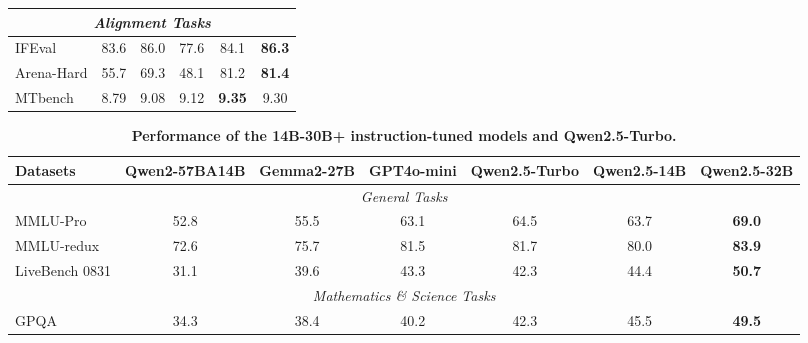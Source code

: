 \documentclass{article}
\begin{document}
\begin{table}[tbp]
\begin{tabular}{@{}lccccc@{}}
\midrule
\multicolumn{6}{c}{\textit{Alignment Tasks}} \\
\midrule

IFEval  & 83.6 & 86.0 & 77.6 & 84.1 & \textbf{86.3}\\

Arena-Hard  & 55.7 & 69.3 & 48.1 & 81.2 & \textbf{81.4}\\

MTbench  & 8.79 & 9.08 & 9.12 & \textbf{9.35} & 9.30\\

\bottomrule

\end{tabular}

\end{table}

\begin{table}[tbp]

\centering

\caption{\textbf{Performance of the 14B-30B+ instruction-tuned models and Qwen2.5-Turbo.}}

\label{tab:14b-instruct}
\small
\setlength{\tabcolsep}{2.6pt}

\begin{tabular}{@{}lcccccc@{}}

\toprule

\textbf{Datasets} & \textbf{Qwen2-57BA14B} & \textbf{Gemma2-27B} & \textbf{GPT4o-mini} & \textbf{Qwen2.5-Turbo} & \textbf{Qwen2.5-14B} & \textbf{Qwen2.5-32B} \\

\midrule

\multicolumn{7}{c}{\textit{General Tasks}} \\

\midrule

MMLU-Pro & 52.8 & 55.5 & 63.1 & 64.5 & 63.7 & \textbf{69.0} \\

MMLU-redux & 72.6 & 75.7 & 81.5 & 81.7 & 80.0 & \textbf{83.9} \\

LiveBench 0831 & 31.1 & 39.6 & 43.3 & 42.3 & 44.4 & \textbf{50.7} \\

\midrule

\multicolumn{7}{c}{\textit{Mathematics \& Science Tasks}} \\

\midrule

GPQA & 34.3 & 38.4 & 40.2 & 42.3 & 45.5 & \textbf{49.5} \\


\end{tabular}
\end{table}
\end{document}

